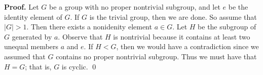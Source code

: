 \begin{enumerate}
      \textbf{Proof.} Let $G$ be a group with no proper nontrivial subgroup, and
      let $e$ be the identity element of $G$. If $G$ is the trivial group, then 
      we are done. So assume that $|G| > 1$. Then there exists a nonidenity 
      element $a \in G$. Let $H$ be the subgroup of $G$ generated by $a$. 
      Observe that $H$ is nontrivial because it contains at least two unequal 
      members $a$ and $e$. If $H < G$, then we would have a contradiction since 
      we assumed that $G$ contains no proper nontrivial subgroup. Thus we must 
      have that $H = G$; that is, $G$ is cyclic. \qed
\end{enumerate}
